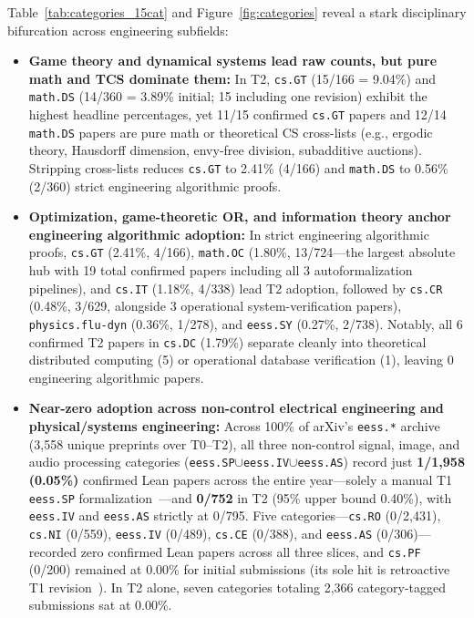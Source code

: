\documentclass[11pt,letterpaper]{article}
\begin{document}
Table~\ref{tab:categories_15cat} and Figure~\ref{fig:categories} reveal a stark disciplinary bifurcation across engineering subfields:
\begin{itemize}
  \item \textbf{Game theory and dynamical systems lead raw counts, but pure math and TCS dominate them:} In T2, \texttt{cs.GT} (15/166 = 9.04\%) and \texttt{math.DS} (14/360 = 3.89\% initial; 15 including one revision) exhibit the highest headline percentages, yet 11/15 confirmed \texttt{cs.GT} papers and 12/14 \texttt{math.DS} papers are pure math or theoretical CS cross-lists (e.g., ergodic theory, Hausdorff dimension, envy-free division, subadditive auctions). Stripping cross-lists reduces \texttt{cs.GT} to 2.41\% (4/166) and \texttt{math.DS} to 0.56\% (2/360) strict engineering algorithmic proofs.
  \item \textbf{Optimization, game-theoretic OR, and information theory anchor engineering algorithmic adoption:} In strict engineering algorithmic proofs, \texttt{cs.GT} (2.41\%, 4/166), \texttt{math.OC} (1.80\%, 13/724---the largest absolute hub with 19 total confirmed papers including all 3 autoformalization pipelines), and \texttt{cs.IT} (1.18\%, 4/338) lead T2 adoption, followed by \texttt{cs.CR} (0.48\%, 3/629, alongside 3 operational system-verification papers), \texttt{physics.flu-dyn} (0.36\%, 1/278), and \texttt{eess.SY} (0.27\%, 2/738). Notably, all 6 confirmed T2 papers in \texttt{cs.DC} (1.79\%) separate cleanly into theoretical distributed computing (5) or operational database verification (1), leaving 0 engineering algorithmic papers.
  \item \textbf{Near-zero adoption across non-control electrical engineering and physical/systems engineering:} Across 100\% of arXiv's \texttt{eess.*} archive (3,558 unique preprints over T0--T2), all three non-control signal, image, and audio processing categories (\texttt{eess.SP}$\cup$\texttt{eess.IV}$\cup$\texttt{eess.AS}) record just \textbf{1/1,958 (0.05\%)} confirmed Lean papers across the entire year---solely a manual T1 \texttt{eess.SP} formalization~\cite{arxiv2605_14610}---and \textbf{0/752} in T2 (95\% upper bound 0.40\%), with \texttt{eess.IV} and \texttt{eess.AS} strictly at 0/795. Five categories---\texttt{cs.RO} (0/2,431), \texttt{cs.NI} (0/559), \texttt{eess.IV} (0/489), \texttt{cs.CE} (0/388), and \texttt{eess.AS} (0/306)---recorded zero confirmed Lean papers across all three slices, and \texttt{cs.PF} (0/200) remained at 0.00\% for initial submissions (its sole hit is retroactive T1 revision~\cite{arxiv2605_01140}). In T2 alone, seven categories totaling 2,366 category-tagged submissions sat at 0.00\%.
\end{itemize}
\end{document}
